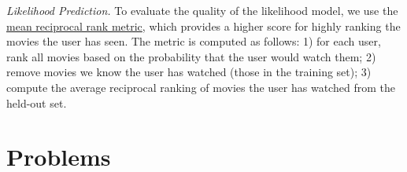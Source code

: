 \documentclass[12pt]{article}
\begin{document}
    \vspace{0.2cm}
    \noindent \emph{Likelihood Prediction.}  
    To evaluate the quality of the likelihood model, we use the \href{https://en.wikipedia.org/wiki/Mean_reciprocal_rank} {mean reciprocal rank metric}, which provides a higher score for highly ranking the movies the user has seen. The metric is computed as follows: 1) for each user, rank all movies based on the probability that the user would watch them; 2) remove movies we know the user has watched (those in the training set); 3) compute the average reciprocal ranking of movies the user has watched from the held-out set. 
    

    
    


\section{Problems}
\end{document}
